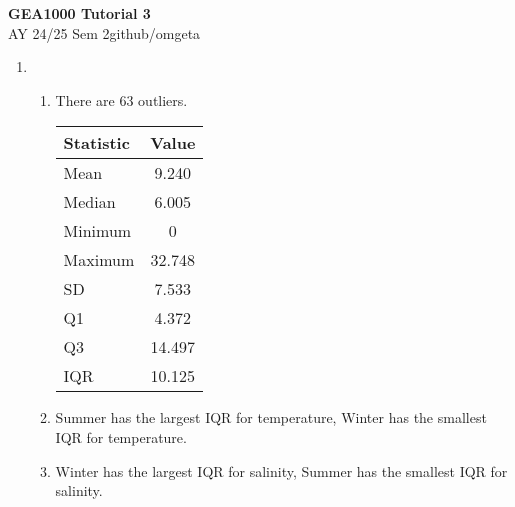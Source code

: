 \documentclass[12pt, a4paper]{article}
\newcommand{\mytitle}{GEA1000 Tutorial 3}
\newcommand{\myauthor}{github/omgeta}
\newcommand{\mydate}{AY 24/25 Sem 2}
\begin{document}
\raggedright
\footnotesize
\begin{center}
{\normalsize{\textbf{\mytitle}}} \\
{\footnotesize{\mydate\hspace{2pt}\textemdash\hspace{2pt}\myauthor}}
\end{center}
\begin{enumerate}[Q\arabic*.]
  \item 
    \begin{enumerate}[(\alph*.)]
      \item There are $63$ outliers.
      \begin{center}
        \begin{table}[h]
          \centering
          \begin{tabular}{|l|c|}
              \hline
              \textbf{Statistic} & \textbf{Value} \\ 
              \hline
              Mean      & 9.240 \\ 
              \hline
              Median    & 6.005 \\ 
              \hline
              Minimum   & 0 \\ 
              \hline
              Maximum   & 32.748 \\ 
              \hline
              SD & 7.533 \\ 
              \hline
              Q1 & 4.372 \\ 
              \hline
              Q3 & 14.497 \\ 
              \hline
              IQR & 10.125 \\ 
              \hline
          \end{tabular}
          \label{tab:summary}
      \end{table}
      \end{center}

    \pagebreak
    \item Summer has the largest IQR for temperature, Winter has the smallest IQR for temperature.
      \begin{center}
      \end{center}

    \item Winter has the largest IQR for salinity, Summer has the smallest IQR for salinity.
      \begin{center}
      \end{center}


\end{enumerate}
\end{enumerate}
\end{document}
